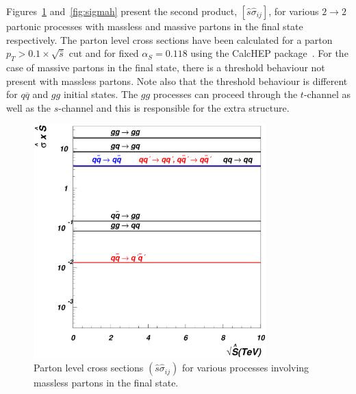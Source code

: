 \documentclass[12pt]{iopart}
\def\as{\alpha_S}
\begin{document}
Figures~\ref{fig:sigma} and~\ref{fig:sigmah} present the second product, 
$\left[\hat{s}\hat{\sigma}_{ij}\right]$, for various $2 \rightarrow 2$ partonic processes with massless and
massive partons in the final state respectively. The parton level cross sections have been calculated for a
parton $p_T> 0.1\times\sqrt{\hat{s}}$ cut and for fixed $\as=0.118$ using the CalcHEP
package~\cite{Pukhov:2004ca}. For the case of massive partons in the final state, there is a threshold behaviour
not present with massless partons. Note also that the threshold behaviour is different for $q\overline{q}$ and
$gg$ initial states. The $gg$ processes can proceed through the $t$-channel as well as the $s$-channel and this is
responsible for the extra structure. 
%
\begin{figure}[t]
\begin{center}
\includegraphics[width=9cm]{sigma.eps}
\end{center}
\vspace*{-0.5cm}
\caption{
Parton level cross sections
$\left(\hat{s}\hat{\sigma}_{ij}\right)$
for various processes involving massless partons in the final state. 
} 
\label{fig:sigma}
\end{figure}
%
%
\end{document}
